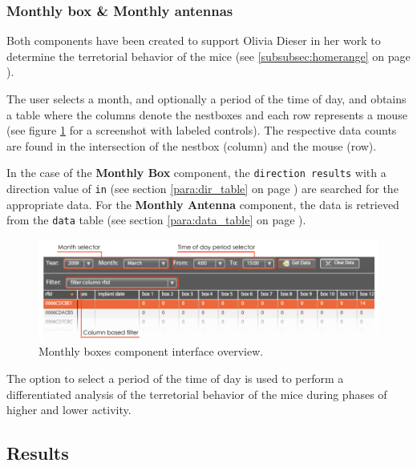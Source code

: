 \subsubsection{Monthly box \& Monthly antennas}
\label{subsubsec:monthbox}

Both components have been created to support Olivia Dieser in her work to determine the terretorial behavior of the mice (see \ref{subsubsec:homerange} on page \pageref{subsubsec:homerange}).

The user selects a month, and optionally a period of the time of day, and obtains a table where the columns denote the nestboxes and each row represents a mouse (see figure \ref{fig:month_box_ant} for a screenshot with labeled controls). The respective data counts are found in the intersection of the nestbox (column) and the mouse (row).

In the case of the \textbf{Monthly Box} component, the \lstinline|direction results| with a direction value of \lstinline|in| (see section \ref{para:dir_table} on page \pageref{para:dir_table}) are searched for the appropriate data. For the \textbf{Monthly Antenna} component, the data is retrieved from the \lstinline|data| table (see section \ref{para:data_table} on page \pageref{para:data_table}).

\begin{figure}[htpb]
\begin{center}
  \includegraphics[width=\textwidth]{assets/pdf/month_box_ant.pdf}
  \caption[Monthly boxes component interface]{Monthly boxes component interface overview.}
  \label{fig:month_box_ant}
\end{center}
\end{figure}

The option to select a period of the time of day is used to perform a differentiated analysis of the terretorial behavior of the mice during phases of higher and lower activity.

\subsection{Results}
\label{subsec:results}

